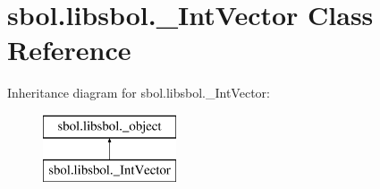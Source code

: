 \hypertarget{classsbol_1_1libsbol_1_1___int_vector}{}\section{sbol.\+libsbol.\+\_\+\+Int\+Vector Class Reference}
\label{classsbol_1_1libsbol_1_1___int_vector}
Inheritance diagram for sbol.\+libsbol.\+\_\+\+Int\+Vector\+:\begin{figure}[H]
\begin{center}
\leavevmode
\includegraphics[height=2.000000cm]{classsbol_1_1libsbol_1_1___int_vector}
\end{center}
\end{figure}
